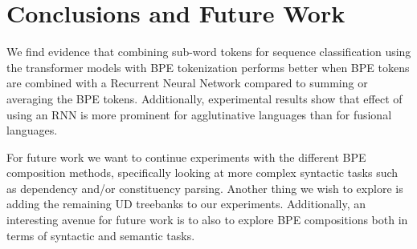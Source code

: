 \documentclass[11pt]{article}
\begin{document}
    
    
    

    
    \section{Conclusions and Future Work}
    
        We find evidence that combining sub-word tokens for sequence
     classification using the transformer models with BPE tokenization
     performs better when BPE tokens are combined with a Recurrent
     Neural Network compared to summing or averaging the BPE tokens.
         Additionally, experimental results show that effect of using
     an RNN is more prominent for agglutinative languages than for
     fusional languages.

                For future work we want to continue experiments with
     the different BPE composition methods, specifically looking at
     more complex syntactic tasks such as dependency and/or
     constituency parsing. Another thing we wish to explore is adding
     the remaining UD treebanks to our experiments.  Additionally, an
     interesting avenue for future work is to also to explore BPE
     compositions both in terms of syntactic and semantic tasks.
    

	
	
	
\end{document}
